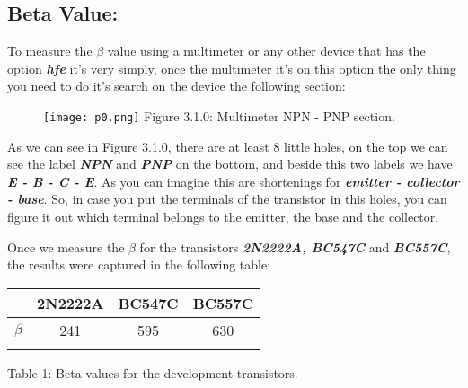 \subsection{Beta Value:}

To measure the $\beta$ value using a multimeter or any other device that has the option {\bfseries\itshape hfe} it's very simply, once the multimeter it's on this option the only thing you need to do it's search on the device the following section:

\begin{figure}[H]
\texttt{[image: p0.png]}
\centering \linebreak \linebreak Figure 3.1.0: Multimeter NPN - PNP section.
\end{figure}

As we can see in Figure 3.1.0, there are at least 8 little holes, on the top we can see the label {\bfseries\itshape NPN} and {\bfseries\itshape PNP} on the bottom, and beside this two labels we have {\bfseries\itshape E - B - C - E}. As you can imagine this are shortenings for {\bfseries\itshape emitter - collector - base}. So, in case you put the terminals of the transistor in this holes, you can figure it out which terminal belongs to the emitter, the base and the collector. \hfill \break

Once we measure the $\beta$ for the transistors {\bfseries\itshape 2N2222A, BC547C} and {\bfseries\itshape BC557C}, the results were captured in the following table: \hfill \break

\begin{center}
\begin{tabular}[5cm]{c c c c}
\toprule
\toprule
\hspace{80pt} & \hspace{35pt} 2N2222A \hspace{35pt} & \hspace{35pt} BC547C \hspace{35pt} & \hspace{35pt} BC557C \hspace{35pt} \\
\midrule
\midrule
$\beta$ & 241 & 595 & 630 \\ 
\bottomrule
\linebreak
\end{tabular}
\linebreak Table 1: Beta values for the development transistors.
\end{center} \hfill \break 

{\bfseries\itshape\color{carmine}{Observation:}} {\itshape{}}

\pagebreak